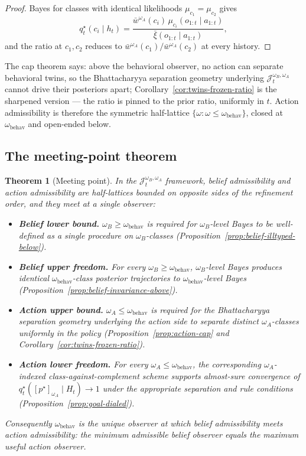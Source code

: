 \documentclass[11pt]{article}
\newtheorem{theorem}{Theorem}[section]
\theoremstyle{definition}
\theoremstyle{remark}
\newcommand{\barxi}{\bar{\xi}}
\begin{document}
\begin{proof}
Bayes for classes with identical likelihoods $\mu_{c_1}=\mu_{c_2}$ gives
\[
q_t^\star(c_i\mid h_t)=\frac{\bar w^{\omega_A}(c_i)\,\mu_{c_i}(o_{1:t}\mid a_{1:t})}{\barxi(o_{1:t}\mid a_{1:t})},
\]
and the ratio at $c_1,c_2$ reduces to $\bar w^{\omega_A}(c_1)/\bar w^{\omega_A}(c_2)$ at every history.
\end{proof}

The cap theorem says: above the behavioral observer, no action can separate behavioral twins, so the Bhattacharyya separation geometry underlying $\mathcal J_t^{\omega_B,\omega_A}$ cannot drive their posteriors apart; Corollary~\ref{cor:twins-frozen-ratio} is the sharpened version --- the ratio is pinned to the prior ratio, uniformly in $t$. Action admissibility is therefore the symmetric half-lattice $\{\omega:\omega\le\omega_{\mathrm{behav}}\}$, closed at $\omega_{\mathrm{behav}}$ and open-ended below.

\subsection{The meeting-point theorem}
\label{sec:meeting-point}

\begin{theorem}[Meeting point]
\label{thm:meeting-point}
In the $\mathcal J_t^{\omega_B,\omega_A}$ framework, belief admissibility and action admissibility are half-lattices bounded on opposite sides of the refinement order, and they meet at a single observer:
\begin{itemize}
\item[(a)] \textbf{Belief lower bound.} $\omega_B\ge\omega_{\mathrm{behav}}$ is required for $\omega_B$-level Bayes to be well-defined as a single procedure on $\omega_B$-classes (Proposition~\ref{prop:belief-illtyped-below}).
\item[(b)] \textbf{Belief upper freedom.} For every $\omega_B\ge\omega_{\mathrm{behav}}$, $\omega_B$-level Bayes produces identical $\omega_{\mathrm{behav}}$-class posterior trajectories to $\omega_{\mathrm{behav}}$-level Bayes (Proposition~\ref{prop:belief-invariance-above}).
\item[(c)] \textbf{Action upper bound.} $\omega_A\le\omega_{\mathrm{behav}}$ is required for the Bhattacharyya separation geometry underlying the action side to separate distinct $\omega_A$-classes uniformly in the policy (Proposition~\ref{prop:action-cap} and Corollary~\ref{cor:twins-frozen-ratio}).
\item[(d)] \textbf{Action lower freedom.} For every $\omega_A\le\omega_{\mathrm{behav}}$, the corresponding $\omega_A$-indexed class-against-complement scheme supports almost-sure convergence of $q_t^\star([p^\star]_{\omega_A}\mid H_t)\to 1$ under the appropriate separation and rule conditions (Proposition~\ref{prop:goal-dialed}).
\end{itemize}
Consequently $\omega_{\mathrm{behav}}$ is the unique observer at which belief admissibility meets action admissibility: the minimum admissible belief observer equals the maximum useful action observer.
\end{theorem}
\end{document}
